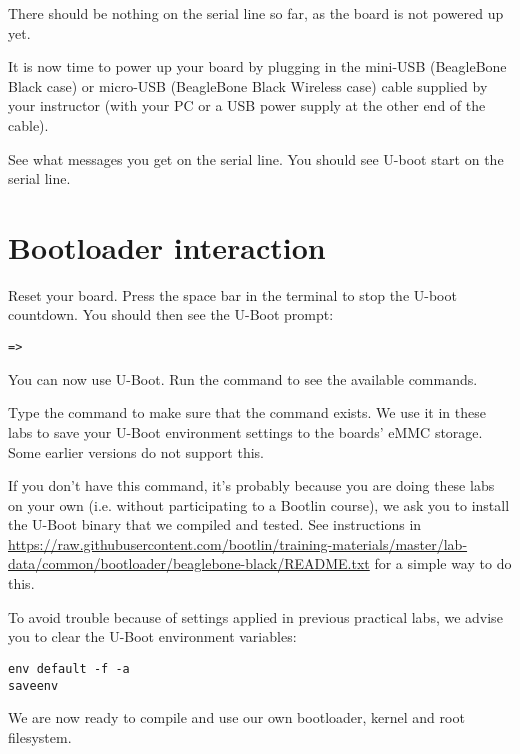 There should be nothing on the serial line so far, as the board is not
powered up yet.

It is now time to power up your board by plugging in the mini-USB
(BeagleBone Black case) or micro-USB (BeagleBone Black Wireless case)
cable supplied by your instructor (with your PC or a USB power supply at the
other end of the cable).

See what messages you get on the serial line. You should see U-boot
start on the serial line.

\section{Bootloader interaction}

Reset your board. Press the space bar in the  terminal
to stop the U-boot countdown. You should then see the U-Boot prompt:

\begin{verbatim}
=>
\end{verbatim}

You can now use U-Boot. Run the  command to see the available
commands.

Type the  command to make sure that the
 command exists. We use it in these labs to
save your U-Boot environment settings to the boards' eMMC storage.
Some earlier versions do not support this.

If you don't have this command, it's probably because you are doing these labs on your own
(i.e. without participating to a Bootlin course), we ask you to install the U-Boot binary
that we compiled and tested. See instructions in
\url{https://raw.githubusercontent.com/bootlin/training-materials/master/lab-data/common/bootloader/beaglebone-black/README.txt}
for a simple way to do this.

To avoid trouble because of settings applied in previous practical labs,
we advise you to clear the U-Boot environment variables:

\begin{verbatim}
env default -f -a
saveenv
\end{verbatim}

We are now ready to compile and use our own bootloader, kernel and root
filesystem.
